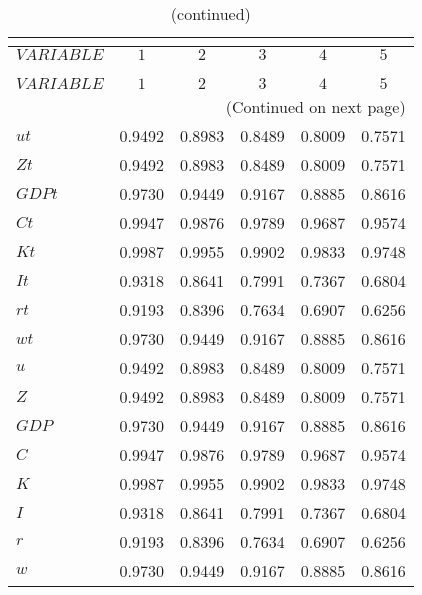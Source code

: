  
\begin{center}
\begin{longtable}{lccccc} 
\caption{AUTOCORRELATION OF SIMULATED VARIABLES}\\
 \label{Table:sim_autocorr_matrix}\\
\toprule 
$VARIABLE  $	 & 	 $         1$	 & 	 $         2$	 & 	 $         3$	 & 	 $         4$	 & 	 $         5$\\
\midrule \endfirsthead 
\caption{(continued)}\\
 \toprule \\ 
$VARIABLE  $	 & 	 $         1$	 & 	 $         2$	 & 	 $         3$	 & 	 $         4$	 & 	 $         5$\\
\midrule \endhead 
\midrule \multicolumn{6}{r}{(Continued on next page)} \\ \bottomrule \endfoot 
\bottomrule \endlastfoot 
$ut        $	 & 	    0.9492	 & 	    0.8983	 & 	    0.8489	 & 	    0.8009	 & 	    0.7571 \\ 
$Zt        $	 & 	    0.9492	 & 	    0.8983	 & 	    0.8489	 & 	    0.8009	 & 	    0.7571 \\ 
$GDPt      $	 & 	    0.9730	 & 	    0.9449	 & 	    0.9167	 & 	    0.8885	 & 	    0.8616 \\ 
$Ct        $	 & 	    0.9947	 & 	    0.9876	 & 	    0.9789	 & 	    0.9687	 & 	    0.9574 \\ 
$Kt        $	 & 	    0.9987	 & 	    0.9955	 & 	    0.9902	 & 	    0.9833	 & 	    0.9748 \\ 
$It        $	 & 	    0.9318	 & 	    0.8641	 & 	    0.7991	 & 	    0.7367	 & 	    0.6804 \\ 
$rt        $	 & 	    0.9193	 & 	    0.8396	 & 	    0.7634	 & 	    0.6907	 & 	    0.6256 \\ 
$wt        $	 & 	    0.9730	 & 	    0.9449	 & 	    0.9167	 & 	    0.8885	 & 	    0.8616 \\ 
$u         $	 & 	    0.9492	 & 	    0.8983	 & 	    0.8489	 & 	    0.8009	 & 	    0.7571 \\ 
$Z         $	 & 	    0.9492	 & 	    0.8983	 & 	    0.8489	 & 	    0.8009	 & 	    0.7571 \\ 
$GDP       $	 & 	    0.9730	 & 	    0.9449	 & 	    0.9167	 & 	    0.8885	 & 	    0.8616 \\ 
$C         $	 & 	    0.9947	 & 	    0.9876	 & 	    0.9789	 & 	    0.9687	 & 	    0.9574 \\ 
$K         $	 & 	    0.9987	 & 	    0.9955	 & 	    0.9902	 & 	    0.9833	 & 	    0.9748 \\ 
$I         $	 & 	    0.9318	 & 	    0.8641	 & 	    0.7991	 & 	    0.7367	 & 	    0.6804 \\ 
$r         $	 & 	    0.9193	 & 	    0.8396	 & 	    0.7634	 & 	    0.6907	 & 	    0.6256 \\ 
$w         $	 & 	    0.9730	 & 	    0.9449	 & 	    0.9167	 & 	    0.8885	 & 	    0.8616 \\ 
\end{longtable}
 \end{center}
